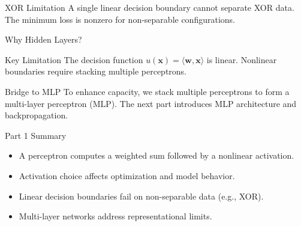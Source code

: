 \documentclass[10pt]{beamer}
\begin{document}
\begin{frame}{XOR Limitation}
  \justifying
  A single linear decision boundary cannot separate XOR data.
  The minimum loss is nonzero for non-separable configurations.
\end{frame}

\begin{frame}{Why Hidden Layers?}
  \justifying
  \begin{conceptbox}{Key Limitation}
    The decision function $u(\bm{x}) = \langle \bm{w}, \bm{x} \rangle$ is linear.
    Nonlinear boundaries require stacking multiple perceptrons.
  \end{conceptbox}
\end{frame}

\begin{frame}{Bridge to MLP}
  \justifying
  To enhance capacity, we stack multiple perceptrons to form a multi-layer perceptron (MLP).
  The next part introduces MLP architecture and backpropagation.
\end{frame}

\begin{frame}{Part 1 Summary}
  \justifying
  \begin{itemize}
    \item A perceptron computes a weighted sum followed by a nonlinear activation.
    \item Activation choice affects optimization and model behavior.
    \item Linear decision boundaries fail on non-separable data (e.g., XOR).
    \item Multi-layer networks address representational limits.
  \end{itemize}
\end{frame}
\end{document}
